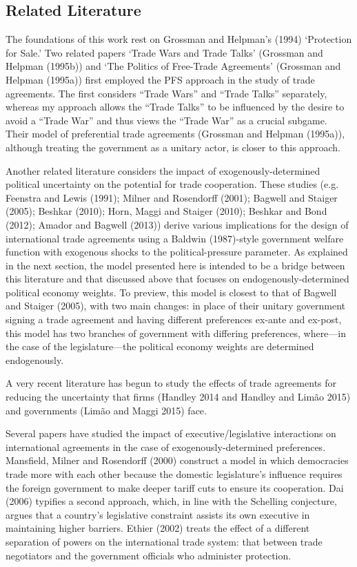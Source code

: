 \documentclass[10pt]{article}
\begin{document}
\subsection{Related Literature}
The foundations of this work rest on Grossman and Helpman's (1994) `Protection for Sale.' Two related papers `Trade Wars and Trade Talks' (Grossman and Helpman (1995b)) and `The Politics of Free-Trade Agreements' (Grossman and Helpman (1995a)) first employed the PFS approach in the study of trade agreements. The first considers ``Trade Wars'' and ``Trade Talks'' separately, whereas my approach allows the ``Trade Talks'' to be influenced by the desire to avoid a ``Trade War'' and thus views the ``Trade War'' as a crucial subgame. Their model of preferential trade agreements (Grossman and Helpman (1995a)), although treating the government as a unitary actor, is closer to this approach.

Another related literature considers the impact of exogenously-determined political uncertainty on the potential for trade cooperation. These studies (e.g. Feenstra and Lewis (1991); Milner and Rosendorff (2001); Bagwell and Staiger (2005); Beshkar (2010); Horn, Maggi and Staiger (2010); Beshkar and Bond (2012); Amador and Bagwell (2013)) derive various implications for the design of international trade agreements using a Baldwin (1987)-style government welfare function with exogenous shocks to the political-pressure parameter. As explained in the next section, the model presented here is intended to be a bridge between this literature and that discussed above that focuses on endogenously-determined political economy weights. To preview, this model is closest to that of Bagwell and Staiger (2005), with two main changes: in place of their unitary government signing a trade agreement and having different preferences ex-ante and ex-post, this model has two branches of government with differing preferences, where---in the case of the legislature---the political economy weights are determined endogenously.
		
A very recent literature has begun to study the effects of trade agreements for reducing the uncertainty that firms (Handley 2014 and Handley and Lim\~{a}o 2015) and governments (Lim\~{a}o and Maggi 2015) face.

Several papers have studied the impact of executive/legislative interactions on international agreements in the case of exogenously-determined preferences. Mansfield, Milner and Rosendorff (2000) construct a model in which democracies trade more with each other because the domestic legislature's influence requires the foreign government to make deeper tariff cuts to ensure its cooperation. Dai (2006) typifies a second approach, which, in line with the Schelling conjecture, argues that a country's legislative constraint assists its own executive in maintaining higher barriers. Ethier (2002) treats the effect of a different separation of powers on the international trade system: that between trade negotiators and the government officials who administer protection.
\end{document}
